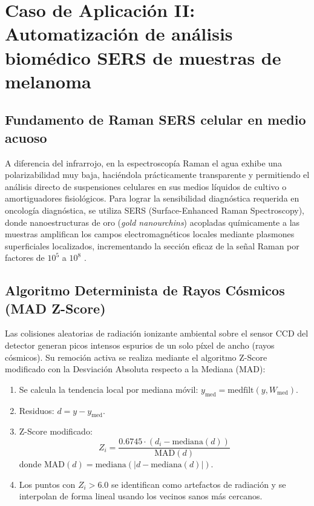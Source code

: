 \section{Caso de Aplicación II: Automatización de análisis biomédico SERS de muestras de melanoma}

\subsection{Fundamento de Raman SERS celular en medio acuoso}
A diferencia del infrarrojo, en la espectroscopía Raman el agua exhibe una polarizabilidad muy baja, haciéndola prácticamente transparente y permitiendo el análisis directo de suspensiones celulares en sus medios líquidos de cultivo o amortiguadores fisiológicos. Para lograr la sensibilidad diagnóstica requerida en oncología diagnóstica, se utiliza SERS (Surface-Enhanced Raman Spectroscopy), donde nanoestructuras de oro (\textit{gold nanourchins}) acopladas químicamente a las muestras amplifican los campos electromagnéticos locales mediante plasmones superficiales localizados, incrementando la sección eficaz de la señal Raman por factores de $10^5$ a $10^8$ \cite{erzina2020}.

\subsection{Algoritmo Determinista de Rayos Cósmicos (MAD Z-Score)}
Las colisiones aleatorias de radiación ionizante ambiental sobre el sensor CCD del detector generan picos intensos espurios de un solo píxel de ancho (rayos cósmicos). Su remoción activa se realiza mediante el algoritmo Z-Score modificado con la Desviación Absoluta respecto a la Mediana (MAD):
\begin{enumerate}
    \item Se calcula la tendencia local por mediana móvil: $y_{\text{med}} = \text{medfilt}(y, W_{\text{med}})$.
    \item Residuos: $d = y - y_{\text{med}}$.
    \item Z-Score modificado:
    \begin{equation}
        Z_i = \frac{0.6745 \cdot (d_i - \text{mediana}(d))}{\text{MAD}(d)}
    \end{equation}
    donde $\text{MAD}(d) = \text{mediana}(|d - \text{mediana}(d)|)$.
    \item Los puntos con $Z_i > 6.0$ se identifican como artefactos de radiación y se interpolan de forma lineal usando los vecinos sanos más cercanos.
\end{enumerate}

